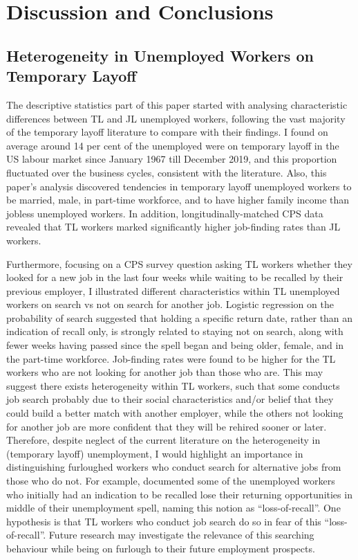 \documentclass[a4paper, 11pt, tikz]{article}
\begin{document}
\section{Discussion and Conclusions}
\subsection{Heterogeneity in Unemployed Workers on Temporary Layoff}
The descriptive statistics part of this paper started with analysing characteristic differences between TL and JL unemployed workers, following the vast majority of the temporary layoff literature to compare with their findings.
I found on average around 14 per cent of the unemployed were on temporary layoff in the US labour market since January 1967 till December 2019, and this proportion fluctuated over the business cycles, consistent with the literature.
Also, this paper's analysis discovered tendencies in temporary layoff unemployed workers to be married, male, in part-time workforce, and to have higher family income than jobless unemployed workers.
In addition, longitudinally-matched CPS data revealed that TL workers marked significantly higher job-finding rates than JL workers.

Furthermore, focusing on a CPS survey question asking TL workers whether they looked for a new job in the last four weeks while waiting to be recalled by their previous employer, I illustrated different characteristics within TL unemployed workers on search vs not on search for another job.
Logistic regression on the probability of search suggested that holding a specific return date, rather than an indication of recall only, is strongly related to staying not on search, along with fewer weeks having passed since the spell began and being older, female, and in the part-time workforce.
Job-finding rates were found to be higher for the TL workers who are not looking for another job than those who are.
This may suggest there exists heterogeneity within TL workers, such that some conducts job search probably due to their social characteristics and/or belief that they could build a better match with another employer, while the others not looking for another job are more confident that they will be rehired sooner or later.
Therefore, despite neglect of the current literature on the heterogeneity in (temporary layoff) unemployment, I would highlight an importance in distinguishing furloughed workers who conduct search for alternative jobs from those who do not.
For example, \cite{gertler2022temporary} documented some of the unemployed workers who initially had an indication to be recalled lose their returning opportunities in middle of their unemployment spell, naming this notion as ``loss-of-recall''.
One hypothesis is that TL workers who conduct job search do so in fear of this ``loss-of-recall''.
Future research may investigate the relevance of this searching behaviour while being on furlough to their future employment prospects.
\end{document}
